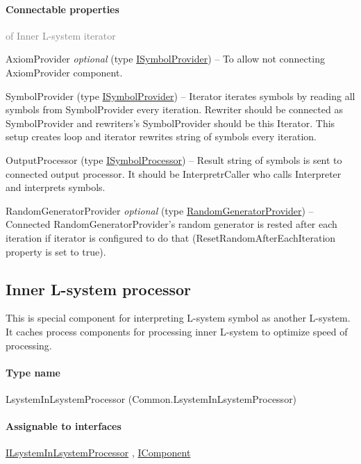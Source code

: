 	\paragraph{Connectable properties}\textcolor{gray}{of Inner L-system iterator}
	\begin{description*}
		\item[AxiomProvider]
 \textit{optional} 		(type \hyperref[Malsys.Processing.Components.ISymbolProvider]{ISymbolProvider})
			-- To allow not connecting AxiomProvider component.
		\item[SymbolProvider]
		(type \hyperref[Malsys.Processing.Components.ISymbolProvider]{ISymbolProvider})
			-- Iterator iterates symbols by reading all symbols from SymbolProvider every iteration.
            Rewriter should be connected as SymbolProvider and rewriters's SymbolProvider should be this Iterator.
            This setup creates loop and iterator rewrites string of symbols every iteration.
		\item[OutputProcessor]
		(type \hyperref[Malsys.Processing.Components.ISymbolProcessor]{ISymbolProcessor})
			-- Result string of symbols is sent to connected output processor.
            It should be InterpretrCaller who calls Interpreter and interprets symbols.
		\item[RandomGeneratorProvider]
 \textit{optional} 		(type \hyperref[Malsys.Processing.Components.Common.RandomGeneratorProvider]{RandomGeneratorProvider})
			-- Connected RandomGeneratorProvider's random generator is rested after each iteration
            if iterator is configured to do that (ResetRandomAfterEachIteration property is set to true).
	\end{description*}
	

\subsection{Inner L-system processor}
\label{Malsys.Processing.Components.Common.LsystemInLsystemProcessor}
This is special component for interpreting L-system symbol as another L-system.
            It caches process components for processing inner L-system to optimize speed of processing.\paragraph{Type name}
LsystemInLsystemProcessor (Common.LsystemInLsystemProcessor) 	\paragraph{Assignable to interfaces}
		\hyperref[Malsys.Processing.Components.Common.ILsystemInLsystemProcessor]{ILsystemInLsystemProcessor}%
, 		\hyperref[Malsys.Processing.Components.IComponent]{IComponent}%
	
